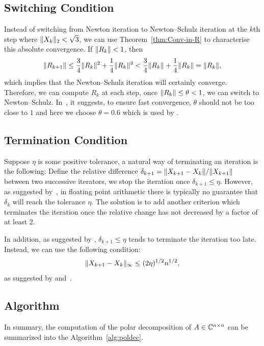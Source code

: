 \documentclass[12pt]{article}
\begin{document}
\subsection{Switching Condition}
Instead of switching from Newton iteration to Newton--Schulz iteration at the $k$th step where $\|{X_k}\|_2 < \sqrt{3}$, we can use Theorem~\ref{thm:Conv-in-R} to characterise this absolute convergence. If $\|{R_{k}}\| < 1$, then 
\begin{equation}
    \notag 
    \|{R_{k+1}}\| \leq \frac{3}{4}\|{R_k}\|^2 + \frac{1}{4}\|{R_k}\|^3 < \frac{3}{4}\|{R_k}\| + \frac{1}{4}\|{R_k}\| = \|{R_k}\|,
\end{equation}
which implies that the Newton--Schulz iteration will certainly converge. Therefore, we can compute $R_{k}$ at each step, once $\|{R_k}\|\leq\theta<1$, we can switch to Newton--Schulz. In~, it suggests, to ensure fast convergence, $\theta$ should not be too close to $1$ and here we choose $\theta = 0.6$ which is used by \cite{hisc90}.

\subsection{Termination Condition}
Suppose $\eta$ is some positive tolerance, a natural way of terminating an iteration is the following: Define the relative difference $\delta_{k+1} = \|{X_{k+1} - X_{k}}\|/\|{X_{k+1}}\|$ between two successive iterators, we stop the iteration once $\delta_{k+1} \leq \eta$. However, as suggested by~, in floating point arithmetic there is typically no guarantee that $\delta_k$ will reach the tolerance $\eta$. The solution is to add another criterion which terminates the iteration once the relative change has not decreased by a factor of at least 2.

In addition, as suggested by , $\delta_{k+1}\leq \eta$ tends to terminate the iteration too late. Instead, we can use the following condition:
\begin{equation}
    \notag 
    \|{X_{k+1} - X_{k}}\|_\infty \le (2\eta)^{1/2}n^{1/2},
\end{equation}
as suggested by  and~.

\subsection{Algorithm}
In summary, the computation of the polar decomposition of $A\in\mathbb{C}^{n\times n}$ can be summarized into the Algorithm~\ref{alg:poldec}.
\end{document}
